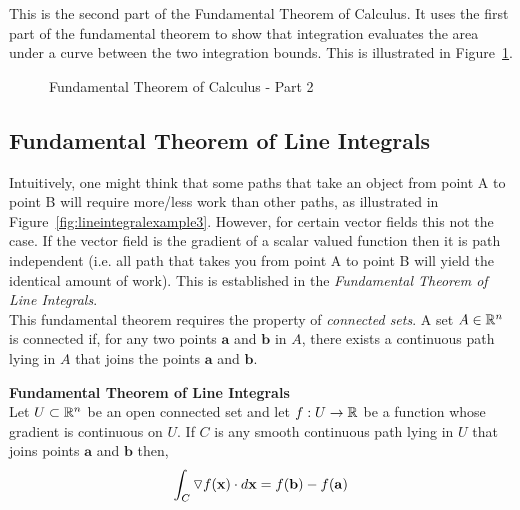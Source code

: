 \documentclass[12pt]{article}
\begin{document}
This is the second part of the Fundamental Theorem of Calculus. It uses the first part of the fundamental theorem to show that integration evaluates the area under a curve between the two integration bounds. This is illustrated in Figure~\ref{fig:ftc2}.

\begin{figure}[h]
\centering
\caption{Fundamental Theorem of Calculus - Part 2}
\label{fig:ftc2}
\end{figure}

\subsection{Fundamental Theorem of Line Integrals}

Intuitively, one might think that some paths that take an object from point A to point B will require more/less work than other paths, as illustrated in Figure~\ref{fig:lineintegralexample3}. However, for certain vector fields this not the case. If the vector field is the gradient of a scalar valued function then it is path independent (i.e. all path that takes you from point A to point B will yield the identical amount of work). This is established in the \emph{Fundamental Theorem of Line Integrals}.\\

This fundamental theorem requires the property of \emph{connected sets}. A set  $A\in\mathbb{R}^n$ is connected if, for any two points $\mathbf{a}$ and $\mathbf{b}$ in $A$, there exists a continuous path lying in $A$ that joins the points $\mathbf{a}$ and $\mathbf{b}$. \\

\begin{framed}
\textbf{Fundamental Theorem of Line Integrals}\\
Let $U\subset\mathbb{R}^n$ be an open connected set and let $f:U\rightarrow\mathbb{R}$ be a function whose gradient is continuous on $U$. If $C$ is any smooth continuous path lying in $U$ that joins points $\mathbf{a}$ and $\mathbf{b}$ then,
\[
\int_C \triangledown f(\mathbf{x}) \cdot d\mathbf{x} = f(\mathbf{b})-f(\mathbf{a})
\]
\end{framed}
\end{document}
